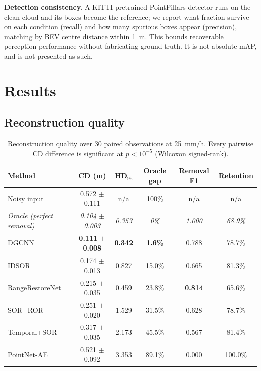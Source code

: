 \documentclass[11pt,a4paper]{article}
\begin{document}
\textbf{Detection consistency.} A KITTI-pretrained PointPillars detector runs
on the clean cloud and its boxes become the reference; we report what
fraction survive on each condition (recall) and how many spurious boxes
appear (precision), matching by BEV centre distance within 1~m. This bounds
recoverable perception performance without fabricating ground truth. It is
not absolute mAP, and is not presented as such.

\section{Results}

\subsection{Reconstruction quality}

\begin{table}[H]
\centering\small
\setlength{\tabcolsep}{5pt}
\begin{tabular}{lccccc}
\toprule
\textbf{Method} & \textbf{CD (m)} & \textbf{HD$_{95}$} &
\textbf{Oracle gap} & \textbf{Removal F1} & \textbf{Retention}\\
\midrule
Noisy input & 0.572 $\pm$ 0.111 & n/a & 100\% & n/a & n/a\\
\rowcolor{gray!12}\emph{Oracle (perfect removal)} & \emph{0.104 $\pm$ 0.003} & \emph{0.353} & \emph{0\%} & \emph{1.000} & \emph{68.9\%}\\
DGCNN & \textbf{0.111 $\pm$ 0.008} & \textbf{0.342} & \textbf{1.6\%} & 0.788 & 78.7\%\\
IDSOR & 0.174 $\pm$ 0.013 & 0.827 & 15.0\% & 0.665 & 81.3\%\\
RangeRestoreNet & 0.215 $\pm$ 0.035 & 0.459 & 23.8\% & \textbf{0.814} & 65.6\%\\
SOR+ROR & 0.251 $\pm$ 0.020 & 1.529 & 31.5\% & 0.628 & 78.7\%\\
Temporal+SOR & 0.317 $\pm$ 0.035 & 2.173 & 45.5\% & 0.567 & 81.4\%\\
PointNet-AE & 0.521 $\pm$ 0.092 & 3.353 & 89.1\% & 0.000 & 100.0\%\\
\bottomrule
\end{tabular}
\caption{Reconstruction quality over 30 paired observations at 25~mm/h. Every
pairwise CD difference is significant at $p<10^{-5}$ (Wilcoxon signed-rank).}
\end{table}
\end{document}
